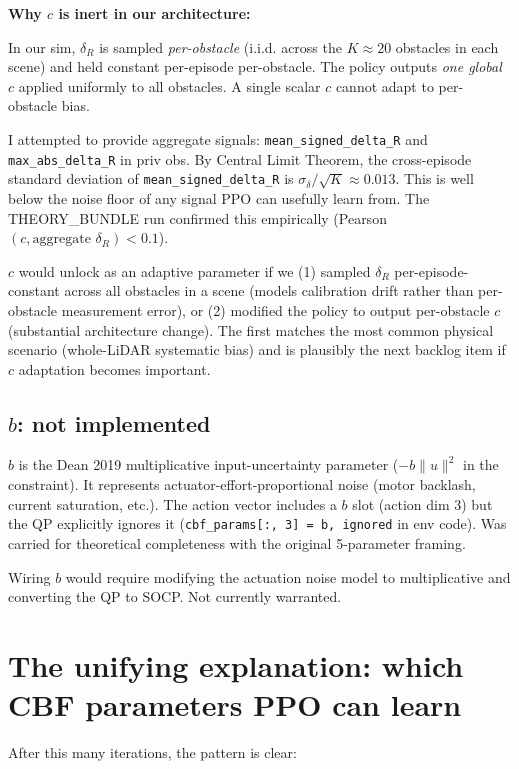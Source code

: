 \documentclass[11pt]{article}
\begin{document}
\textbf{Why $c$ is inert in our architecture:}

In our sim, $\delta_R$ is sampled \emph{per-obstacle} (i.i.d. across the $K \approx 20$ obstacles in each scene) and held constant per-episode per-obstacle. The policy outputs \emph{one global $c$} applied uniformly to all obstacles. A single scalar $c$ cannot adapt to per-obstacle bias.

I attempted to provide aggregate signals: \texttt{mean\_signed\_delta\_R} and \texttt{max\_abs\_delta\_R} in priv obs. By Central Limit Theorem, the cross-episode standard deviation of \texttt{mean\_signed\_delta\_R} is $\sigma_\delta / \sqrt{K} \approx 0.013$. This is well below the noise floor of any signal PPO can usefully learn from. The THEORY\_BUNDLE run confirmed this empirically (Pearson$(c, \text{aggregate } \delta_R) < 0.1$).

$c$ would unlock as an adaptive parameter if we (1) sampled $\delta_R$ per-episode-constant across all obstacles in a scene (models calibration drift rather than per-obstacle measurement error), or (2) modified the policy to output per-obstacle $c$ (substantial architecture change). The first matches the most common physical scenario (whole-LiDAR systematic bias) and is plausibly the next backlog item if $c$ adaptation becomes important.

\subsection*{$b$: not implemented}

$b$ is the Dean 2019 multiplicative input-uncertainty parameter ($-b \|u\|^2$ in the constraint). It represents actuator-effort-proportional noise (motor backlash, current saturation, etc.). The action vector includes a $b$ slot (action dim 3) but the QP explicitly ignores it (\texttt{cbf\_params[:, 3] = b, ignored} in env code). Was carried for theoretical completeness with the original 5-parameter framing.

Wiring $b$ would require modifying the actuation noise model to multiplicative and converting the QP to SOCP. Not currently warranted.

\section*{The unifying explanation: which CBF parameters PPO can learn}

After this many iterations, the pattern is clear:
\end{document}
